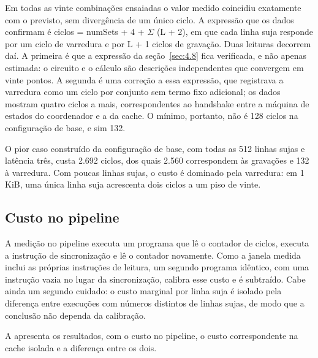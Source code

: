 Em todas as vinte combinações ensaiadas o valor medido coincidiu exatamente com o previsto, sem divergência de um único ciclo. A expressão que os dados confirmam é ciclos = numSets + 4 + $\Sigma$ (L + 2), em que cada linha suja responde por um ciclo de varredura e por L + 1 ciclos de gravação. Duas leituras decorrem daí. A primeira é que a expressão da seção~\ref{sec:4.8} fica verificada, e não apenas estimada: o circuito e o cálculo são descrições independentes que convergem em vinte pontos. A segunda é uma correção a essa expressão, que registrava a varredura como um ciclo por conjunto sem termo fixo adicional; os dados mostram quatro ciclos a mais, correspondentes ao handshake entre a máquina de estados do coordenador e a da cache. O mínimo, portanto, não é 128 ciclos na configuração de base, e sim 132.

O pior caso construído da configuração de base, com todas as 512 linhas sujas e latência três, custa 2.692 ciclos, dos quais 2.560 correspondem às gravações e 132 à varredura. Com poucas linhas sujas, o custo é dominado pela varredura: em 1 KiB, uma única linha suja acrescenta dois ciclos a um piso de vinte.

\subsection{Custo no pipeline}\label{sec:6.3.2}

A medição no pipeline executa um programa que lê o contador de ciclos, executa a instrução de sincronização e lê o contador novamente. Como a janela medida inclui as próprias instruções de leitura, um segundo programa idêntico, com uma instrução vazia no lugar da sincronização, calibra esse custo e é subtraído. Cabe ainda um segundo cuidado: o custo marginal por linha suja é isolado pela diferença entre execuções com números distintos de linhas sujas, de modo que a conclusão não dependa da calibração.

A  apresenta os resultados, com o custo no pipeline, o custo correspondente na cache isolada e a diferença entre os dois.

